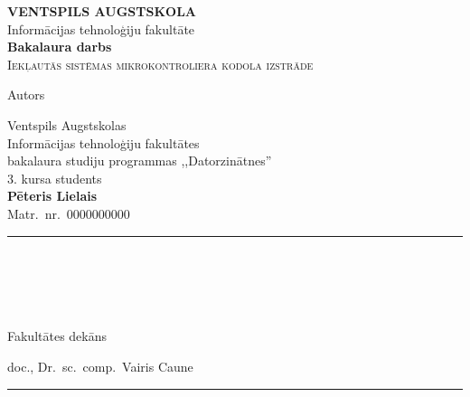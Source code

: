 \begin{titlepage}
	\centering
	\Large\MakeUppercase{\textbf{Ventspils Augstskola}}\\
	\large Informācijas tehnoloģiju fakultāte\\[2cm]
	
	\textbf{Bakalaura darbs}\\[1.5cm]
	
	\textsc{\LARGE Iekļautās sistēmas mikrokontroliera kodola izstrāde} %
	\vfill %
	
	\normalsize
	\begin{minipage}[t]{0.4\textwidth}
		\begin{flushleft}
			Autors
		\end{flushleft}
	\end{minipage}
	\begin{minipage}[t]{0.58\textwidth}
		\begin{flushleft}
			Ventspils Augstskolas \\
			Informācijas tehnoloģiju fakultātes \\
			bakalaura studiju programmas ,,Datorzinātnes''\\
			3. kursa students \\
			\textbf{Pēteris Lielais}\\                  %
			Matr.~nr.~0000000000\\
			\rule[-1em]{10em}{0.3pt}\\
			\\[1cm]
		\end{flushleft}
	\end{minipage}\\[2em]
	\begin{minipage}[t]{0.4\textwidth}
		\begin{flushleft}
			Fakultātes dekāns
		\end{flushleft}
	\end{minipage}
	\begin{minipage}[t]{0.58\textwidth}
		\begin{flushleft}
			doc., Dr.~sc.~comp.~Vairis Caune\\[1ex]
			\rule[-1em]{10em}{0.3pt}\\

\end{flushleft}
\end{minipage}
\end{titlepage}
